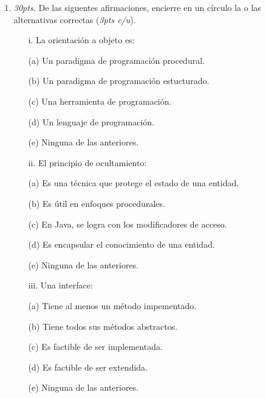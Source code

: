 \documentclass[10pt]{article}
\begin{document}
\begin{enumerate}

    \item \emph{30pts.} De las siguentes afirmaciones, encierre en un c\'irculo la o las alternativas correctas (\emph{3pts c/u}).    

	{\footnotesize
    
    \begin{multicols}{2}

	\begin{enumerate}[label=(\alph*)]
        \item[i.] La orientaci\'on a objeto es: 
        \item[(a)] Un paradigma de programaci\'on procedural.
        \item[(b)] Un paradigma de programaci\'on estucturado.
        \item[(c)] Una herramienta de programaci\'on.
        \item[(d)] Un lenguaje de programaci\'on.
        \item[(e)] Ninguna de las anteriores.
    \end{enumerate}

    \begin{enumerate}[label=(\alph*)]
        \item[ii.] El principio de ocultamiento: 
        \item[(a)] Es una t\'ecnica que protege el estado de una entidad.
        \item[(b)] Es \'util en enfoques procedurales.
        \item[(c)] En Java, se logra con los modificadores de acceso.
        \item[(d)] Es encapsular el conocimiento de una entidad.
        \item[(e)] Ninguna de las anteriores.
    \end{enumerate}

    \begin{enumerate}[label=(\alph*)]
        \item[iii.] Una interface:
        \item[(a)] Tiene al menos un m\'etodo impementado.
        \item[(b)] Tiene todos sus m\'etodos abstractos.
        \item[(c)] Es factible de ser implementada.
        \item[(d)] Es factible de ser extendida.
        \item[(e)] Ninguna de las anteriores.
    \end{enumerate}


\end{multicols}}
\end{enumerate}
\end{document}
